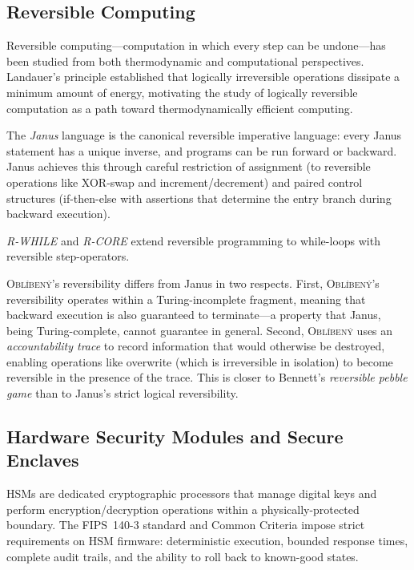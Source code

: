 \documentclass[11pt,a4paper]{article}
\newcommand{\obl}{\textsc{Obl\'{i}ben\'{y}}}
\begin{document}
\subsection{Reversible Computing}

Reversible computing---computation in which every step can be undone---has
been studied from both thermodynamic and computational perspectives.
Landauer's principle \citep{landauer1961irreversibility} established that
logically irreversible operations dissipate a minimum amount of energy,
motivating the study of logically reversible computation as a path toward
thermodynamically efficient computing.

The \emph{Janus} language \citep{yokoyama2007reversible} is the canonical
reversible imperative language: every Janus statement has a unique inverse,
and programs can be run forward or backward.  Janus achieves this through
careful restriction of assignment (to reversible operations like XOR-swap and
increment/decrement) and paired control structures (if-then-else with
assertions that determine the entry branch during backward execution).

\emph{R-WHILE} \citep{gluck2012rwhile} and \emph{R-CORE} extend reversible
programming to while-loops with reversible step-operators.

\obl{}'s reversibility differs from Janus in two respects.  First, \obl{}'s
reversibility operates within a Turing-incomplete fragment, meaning that
backward execution is also guaranteed to terminate---a property that Janus,
being Turing-complete, cannot guarantee in general.  Second, \obl{} uses an
\emph{accountability trace} to record information that would otherwise be
destroyed, enabling operations like overwrite (which is irreversible in
isolation) to become reversible in the presence of the trace.  This is closer
to Bennett's \emph{reversible pebble game} \citep{bennett1989timespace} than
to Janus's strict logical reversibility.

\subsection{Hardware Security Modules and Secure Enclaves}

HSMs are dedicated cryptographic processors that manage digital keys and
perform encryption/decryption operations within a physically-protected
boundary.  The FIPS~140-3 standard \citep{fips1403} and Common Criteria
\citep{commoncriteria} impose strict requirements on HSM firmware:
deterministic execution, bounded response times, complete audit trails, and
the ability to roll back to known-good states.
\end{document}
